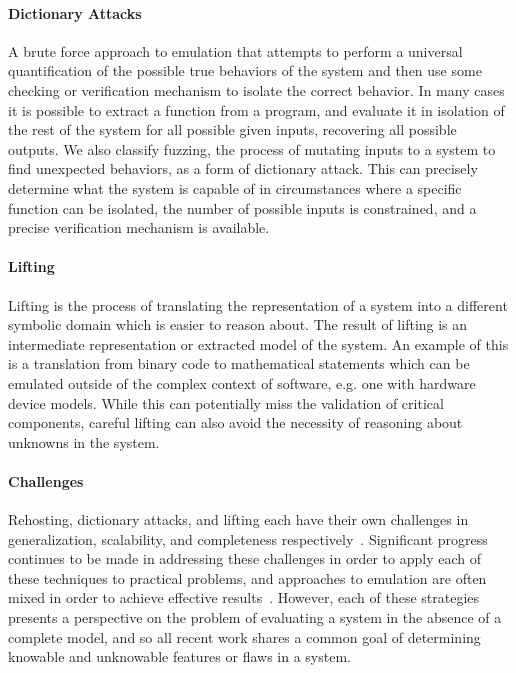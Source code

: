 \paragraph{Dictionary Attacks}
A brute force approach to emulation that attempts to perform a universal quantification of the possible true behaviors of the system and then use some checking or verification mechanism to isolate the correct behavior.
In many cases it is possible to extract a function from a program, and evaluate it in isolation of the rest of the system for all possible given inputs, recovering all possible outputs.
We also classify fuzzing, the process of mutating inputs to a system to find unexpected behaviors, as a form of dictionary attack.
This can precisely determine what the system is capable of in circumstances where a specific function can be isolated, the number of possible inputs is constrained, and a precise verification mechanism is available.

\paragraph{Lifting}
Lifting is the process of translating the representation of a system into a different symbolic domain which is easier to reason about.
The result of lifting is an intermediate representation or extracted model of the system.
An example of this is a translation from binary code to mathematical statements which can be emulated outside of the complex context of software, e.g. one with hardware device models.
While this can potentially miss the validation of critical components, careful lifting can also avoid the necessity of reasoning about unknowns in the system.

\paragraph{Challenges}
Rehosting, dictionary attacks, and lifting each have their own challenges in generalization, scalability, and completeness respectively~\cite{wright2021challenges, delaune2004theory, reps2006intermediate}.
Significant progress continues to be made in addressing these challenges in order to apply each of these techniques to practical problems, and approaches to emulation are often mixed in order to achieve effective results~\cite{p2im2020, clementshalucinator, li2018fuzzing, zheng2019firm, yun2018qsym, borzacchiello2021fuzzolic}.
However, each of these strategies presents a perspective on the problem of evaluating a system in the absence of a complete model, and so all recent work shares a common goal of determining knowable and unknowable features or flaws in a system.

